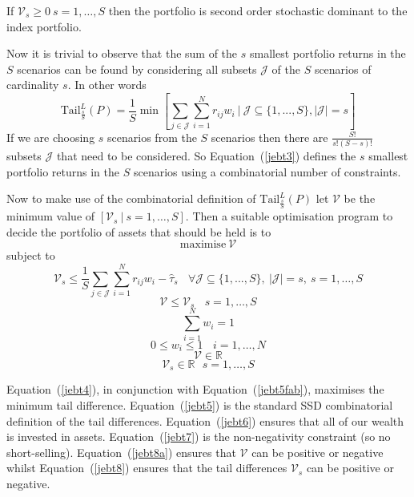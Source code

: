 If $\mathcal{V}_s \geq 0~s=1,\ldots,S$ then the portfolio is second order stochastic dominant to the index portfolio.

Now it is trivial to observe that the sum of the $s$ smallest portfolio returns in the $S$ scenarios can be found by considering all subsets $\mathcal{J}$
 of the $S$ scenarios of cardinality $s$. In other words 
\begin{equation} 
\text{Tail}^L_{\frac{s}{S}}(P) = \frac{1}{S} \min \left[ \sum_{j \in \mathcal{J}} \sum_{i = 1}^N r_{ij} w_i~|~\mathcal{J} \subseteq \{1, ..., S\}, |\mathcal{J}| = s \right]
\label{jebt3}
\end{equation}
If we are choosing $s$ scenarios from the $S$ scenarios then there are  $\frac{S!}{s!(S-s)!}$ subsets $\mathcal{J}$ that need  
to be considered. So Equation~(\ref{jebt3}) defines the  $s$ smallest portfolio returns in the $S$ scenarios using a combinatorial number of constraints.

Now to make use of the combinatorial definition of $\text{Tail}^L_{\frac{s}{S}}(P)$ 
 let $\mathcal{V}$ be the minimum value of  $[\mathcal{V}_s~|~s=1,\ldots,S]$. Then a suitable optimisation program to decide the portfolio
of assets that should be held is to 
\begin{equation}
\mbox{maximise} ~ \mathcal{V}
\label{jebt4}
\end{equation}
subject to 
\begin{equation}
\mathcal{V}_s  \leq \frac{1}{S} \sum_{j \in \mathcal{J}} \sum_{i = 1}^N r_{ij} w_i - \hat{\tau}_s~~~~\forall \mathcal{J} \subseteq \{1, ..., S\},~|\mathcal{J}| = s,~s=1,\ldots,S
\label{jebt5}
\end{equation}
\begin{equation}
\mathcal{V}  \leq \mathcal{V}_s ~~~~s=1,\ldots,S
\label{jebt5fab}
\end{equation}
\begin{equation}
 \sum_{i=1}^N w_i =1
\label{jebt6}
\end{equation}
\begin{equation}
0 \leq w_i \leq 1~~~~i=1,\ldots,N
\label{jebt7}
\end{equation}
\begin{equation}
 \mathcal{V} \in\mathbb{R}
\label{jebt8a}
\end{equation}
\begin{equation}
 \mathcal{V}_s \in\mathbb{R}~~~s=1,\ldots,S
\label{jebt8}
\end{equation}


\sloppy Equation~(\ref{jebt4}), in conjunction with Equation~(\ref{jebt5fab}),  maximises the minimum tail difference. 
Equation~(\ref{jebt5}) is the standard SSD combinatorial definition of the tail differences. 
Equation~(\ref{jebt6}) ensures that all of our wealth is invested in assets. Equation~(\ref{jebt7}) is the non-negativity constraint 
(so no short-selling). Equation~(\ref{jebt8a}) ensures that  $\mathcal{V}$ can be positive or negative whilst
Equation~(\ref{jebt8}) ensures that the tail differences $\mathcal{V}_s$ can be positive or negative.

